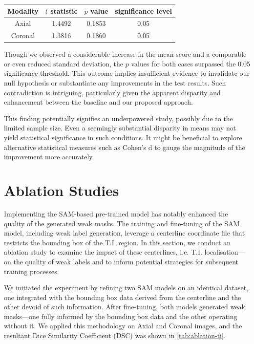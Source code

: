 \begin{table}[ht]
\centering
\begin{tabular}{c|c|c|c}
Modality & \(t\) statistic & \(p\) value & significance level \\
\hline
Axial & 1.4492 & 0.1853 & 0.05 \\
\hline
Coronal & 1.3816 & 0.1860 & 0.05
\end{tabular}
\end{table}

Though we observed a considerable increase in the mean score and a comparable or even reduced standard deviation, the \(p\) values for both cases surpassed the 0.05 significance threshold. This outcome implies insufficient evidence to invalidate our null hypothesis or substantiate any improvements in the test results. Such contradiction is intriguing, particularly given the apparent disparity and enhancement between the baseline and our proposed approach.

This finding potentially signifies an underpowered study, possibly due to the limited sample size. Even a seemingly substantial disparity in means may not yield statistical significance in such conditions. It might be beneficial to explore alternative statistical measures such as Cohen's d to gauge the magnitude of the improvement more accurately.

\section{Ablation Studies}

Implementing the SAM-based pre-trained model has notably enhanced the quality of the generated weak masks. The training and fine-tuning of the SAM model, including weak label generation, leverage a centerline coordinate file that restricts the bounding box of the T.I. region. In this section, we conduct an ablation study to examine the impact of these centerlines, i.e. T.I. localisation—on the quality of weak labels and to inform potential strategies for subsequent training processes.

We initiated the experiment by refining two SAM models on an identical dataset, one integrated with the bounding box data derived from the centerline and the other devoid of such information. After fine-tuning, both models generated weak masks—one fully informed by the bounding box data and the other operating without it. We applied this methodology on Axial and Coronal images, and the resultant Dice Similarity Coefficient (DSC) was shown in \autoref{tab:ablation-ti}.

